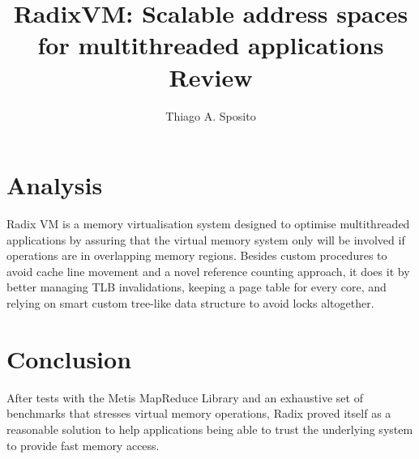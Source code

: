 \documentclass[12pt]{article}
\title{RadixVM: Scalable address spaces for multithreaded applications Review}
\author{Thiago A. Sposito\inst{1} }
\begin{document}
 

\maketitle

\section{Analysis}
Radix VM \cite{clements2013radixvm} is a memory virtualisation system designed to optimise multithreaded applications by assuring that the virtual memory system only will be involved if operations are in overlapping memory regions. Besides custom procedures to avoid cache line movement and a novel reference counting approach, it does it by better managing TLB invalidations, keeping a page table for every core, and relying on smart custom tree-like data structure to avoid locks altogether. 

\section{Conclusion}
After tests with the Metis MapReduce Library and an exhaustive set of benchmarks that stresses virtual memory operations, Radix proved itself as a reasonable solution to help applications being able to trust the underlying system to provide fast memory access.



\end{document}
